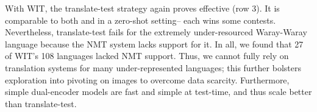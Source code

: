         \begin{table}
          \centering
        \caption{XTD zero-shot Text{}Image Recall@10. }
        \label{tab:xtd10}
        \end{table}
        
        With WIT, the translate-test strategy again proves effective (row 3). It is comparable to both \muralbase and \alignmling in a zero-shot setting-- each wins some contests. Nevertheless, translate-test fails for the extremely under-resourced Waray-Waray language because the NMT system lacks support for it. In all, we found that 27 of WIT's 108 languages lacked NMT support. Thus, we cannot fully rely on translation systems for many under-represented languages; this further bolsters exploration into pivoting on images to overcome data scarcity. Furthermore, simple dual-encoder models are fast and simple at test-time, and thus scale better than translate-test. 
        
